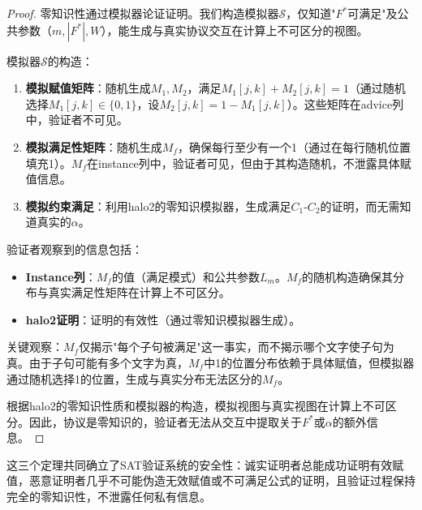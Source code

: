 \begin{proof}
零知识性通过模拟器论证证明。我们构造模拟器$\mathcal{S}$，仅知道"$F^*$可满足"及公共参数（$m, |F^*|, W$），能生成与真实协议交互在计算上不可区分的视图。

模拟器$\mathcal{S}$的构造：
\begin{enumerate}
    \item \textbf{模拟赋值矩阵}：随机生成$M_1, M_2$，满足$M_1[j,k] + M_2[j,k] = 1$（通过随机选择$M_1[j,k] \in \{0,1\}$，设$M_2[j,k] = 1 - M_1[j,k]$）。这些矩阵在advice列中，验证者不可见。
    \item \textbf{模拟满足性矩阵}：随机生成$M_f$，确保每行至少有一个1（通过在每行随机位置填充1）。$M_f$在instance列中，验证者可见，但由于其构造随机，不泄露具体赋值信息。
    \item \textbf{模拟约束满足}：利用halo2的零知识模拟器，生成满足$C_1$-$C_2$的证明，而无需知道真实的$\alpha$。
\end{enumerate}

验证者观察到的信息包括：
\begin{itemize}
    \item \textbf{Instance列}：$M_f$的值（满足模式）和公共参数$L_m$。$M_f$的随机构造确保其分布与真实满足性矩阵在计算上不可区分。
    \item \textbf{halo2证明}：证明的有效性（通过零知识模拟器生成）。
\end{itemize}

关键观察：$M_f$仅揭示"每个子句被满足"这一事实，而不揭示哪个文字使子句为真。由于子句可能有多个文字为真，$M_f$中1的位置分布依赖于具体赋值，但模拟器通过随机选择1的位置，生成与真实分布无法区分的$M_f$。

根据halo2的零知识性质和模拟器的构造，模拟视图与真实视图在计算上不可区分。因此，协议是零知识的，验证者无法从交互中提取关于$F^*$或$\alpha$的额外信息。
\end{proof}

这三个定理共同确立了SAT验证系统的安全性：诚实证明者总能成功证明有效赋值，恶意证明者几乎不可能伪造无效赋值或不可满足公式的证明，且验证过程保持完全的零知识性，不泄露任何私有信息。
